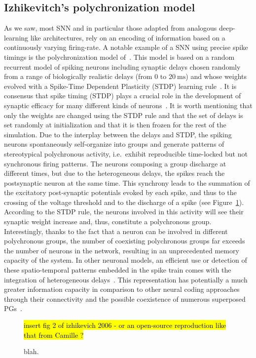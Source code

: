 \documentclass[brainsci, %
               review,submit,pdftex,moreauthors
               ]{Definitions/mdpi}
\newcommand{\ms}{\si{\milli\second}}%
\newcommand{\note}[1]{{\sethlcolor{yellow}\hl{#1}}}
\begin{document}
\subsection{Izhikevitch's polychronization model}
As we saw, most SNN and in particular those adapted from analogous deep-learning like architectures, rely on an encoding of information based on a continuously varying firing-rate. A notable example of a SNN using precise spike timings is the polychronization model of~\citet{izhikevich_polychronization_2006}. This model is based on a random recurrent model of spiking neurons including synaptic delays chosen randomly from a range of biologically realistic delays (from $0$ to $20~\ms$) and whose weights evolved with a Spike-Time Dependent Plasticity (STDP) learning rule~\citep{markram_regulation_1997}. It is consensus that spike timing (STDP) plays a crucial role in the development of synaptic efficacy for many different kinds of neurons~\citep{caporale_spike_2008}. It is worth mentioning that only the weights are changed using the STDP rule and that the set of delays is set randomly at initialization and that it is then frozen for the rest of the simulation. Due to the interplay between the delays and STDP, the spiking neurons spontaneously self-organize into groups and generate patterns of stereotypical polychronous activity, i.e.~exhibit reproducible time-locked but not synchronous firing patterns. The neurons composing a group discharge at different times, but due to the heterogeneous delays, the spikes reach the postsynaptic neuron at the same time. This synchrony leads to the summation of the excitatory post-synaptic potentials evoked by each spike, and thus to the crossing of the voltage threshold and to the discharge of a spike (see Figure~\ref{fig:PG}). According to the STDP rule, the neurons involved in this activity will see their synaptic weight increase and, thus, constitute a polychronous group. Interestingly, thanks to the fact that a neuron can be involved in different polychronous groups, the number of coexisting polychronous groups far exceeds the number of neurons in the network, resulting in an unprecedented memory capacity of the system. In other neuronal models, an efficient use or detection of these spatio-temporal patterns embedded in the spike train comes with the integration of heterogeneous delays~\citep{guise_bayesian_2014,zhang_supervised_2020}. This representation has potentially a much greater information capacity in comparison to other neural coding approaches through their connectivity and the possible coexistence of numerous superposed PGs~\citep{izhikevich_polychronous_2009}.
\begin{figure}
\centering
\note{insert fig 2 of izhikevich 2006 - or an open-source reproduction like that from Camille ? }
\caption{blah.}\label{fig:PG}
\end{figure}
\end{document}
